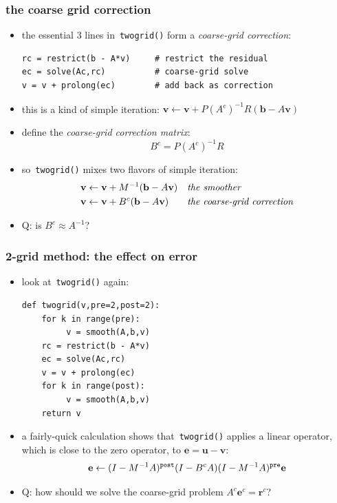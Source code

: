 \documentclass[10pt,
               svgnames,
               hyperref={colorlinks,citecolor=DeepPink4,linkcolor=FireBrick,urlcolor=Maroon},
               usepdftitle=false]{beamer}
\newcommand{\bb}{\mathbf{b}}
\newcommand{\be}{\mathbf{e}}
\newcommand{\br}{\mathbf{r}}
\newcommand{\bu}{\mathbf{u}}
\newcommand{\bv}{\mathbf{v}}
\begin{document}
\begin{frame}[fragile]
\frametitle{the coarse grid correction}
\begin{itemize}
\item the essential 3 lines in \,\texttt{twogrid()} form a \emph{coarse-grid correction}:

\medskip
\begin{verbatim}
rc = restrict(b - A*v)     # restrict the residual
ec = solve(Ac,rc)          # coarse-grid solve
v = v + prolong(ec)        # add back as correction
\end{verbatim}

\smallskip
\item this is a kind of simple iteration: \qquad $\bv \leftarrow \bv + P (A^c)^{-1} R (\bb - A\bv)$
\item define the \emph{coarse-grid correction matrix}:
	$$B^c = P (A^c)^{-1} R$$
\item so \,\texttt{twogrid()} mixes two flavors of simple iteration:
\begin{align*}
\bv &\leftarrow \bv + M^{-1} (\bb - A\bv) &&\text{\emph{the smoother}} \\
\bv &\leftarrow \bv + B^c (\bb - A\bv) &&\text{\emph{the coarse-grid correction}}
\end{align*}

\medskip
\item Q: is $B^c \approx A^{-1}$?  
\end{itemize}
\end{frame}


\begin{frame}[fragile]
\frametitle{2-grid method: the effect on error}
\begin{itemize}
\item look at \,\texttt{twogrid()} again:

\medskip
\begin{verbatim}
def twogrid(v,pre=2,post=2):
    for k in range(pre):
         v = smooth(A,b,v)
    rc = restrict(b - A*v)
    ec = solve(Ac,rc)
    v = v + prolong(ec)
    for k in range(post):
         v = smooth(A,b,v)
    return v
\end{verbatim}

\bigskip
\item a fairly-quick calculation shows that \,\texttt{twogrid()} applies a linear operator, which is \alert{close to the zero operator}, to $\be=\bu-\bv$:
	$$\be \leftarrow (I - M^{-1} A)^{\text{\texttt{post}}} (I - B^c A) (I - M^{-1} A)^{\text{\texttt{pre}}} \be$$

\medskip
\item<2> Q: how should we solve the coarse-grid problem $A^c \be^c = \br^c$?
\end{itemize}
\end{frame}
\end{document}
